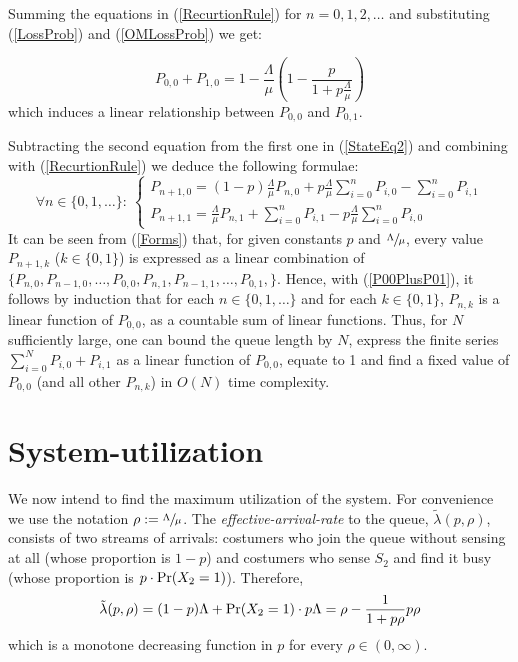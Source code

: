 \documentclass[11pt]{article}
\numberwithin{equation}{section}
\newcommand{\pr}{{\rm Pr}}
\begin{document}
Summing the equations in (\ref{RecurtionRule}) for $n=0,1,2,\ldots$ and substituting (\ref{LossProb}) and (\ref{OMLossProb}) we get:

\begin{equation}
	P_{0,0} + P_{1,0} = 1- \frac{ \Lambda}{ \mu}\left(1- \frac{p}{1+p \frac{\Lambda}{\mu}} \right) \label{P00PlusP01}
\end{equation}
which induces a linear relationship between $P_{0,0}$ and $P_{0,1}$.

Subtracting the second equation from the first one in (\ref{StateEq2}) and combining with (\ref{RecurtionRule}) we deduce the following formulae:
\begin{equation}
	\forall n \in \lbrace 0, 1, \ldots \rbrace: \
  	\begin{cases}
    	P_{n+1,0} = (1-p) \frac{\Lambda}{\mu} P_{n, 0} + p \frac{\Lambda}{\mu} \sum\limits_{i=0}^{n}P_{i,0} - \sum\limits_{i=0}^{n}P_{i,1}\\
   	 	P_{n+1,1} = \frac{\Lambda}{\mu} P_{n, 1} + \sum\limits_{i=0}^{n}P_{i,1} - p \frac{\Lambda}{\mu} \sum\limits_{i=0}^{n}P_{i,0}
  	\end{cases} \label{Forms}
\end{equation}
It can be seen from (\ref{Forms}) that, for given constants $p$ and $\sfrac{\Lambda}{\mu}$, every value $P_{n+1,k}$ ($k\in\lbrace0,1\rbrace$) is expressed as a linear combination of $\lbrace P_{n,0}, P_{n-1,0}, \ldots, P_{0,0}, P_{n,1}, P_{n-1,1}, \ldots, P_{0,1},  \rbrace$. Hence, with (\ref{P00PlusP01}), it follows by induction that for each $n \in \lbrace 0, 1, \ldots \rbrace$ and for each $k \in \lbrace 0, 1 \rbrace$, $P_{n,k}$ is a linear function of $P_{0,0}$, as a countable sum of linear functions. Thus, for $N$ sufficiently large, one can bound the queue length by $N$, express the finite series $\sum_{i=0}^{N} P_{i,0}+P_{i,1}$ as a linear function of $P_{0,0}$, equate to 1 and find a fixed value of $P_{0,0}$ (and all other $P_{n,k}$) in $O(N)$ time complexity.
\newpage

\section{System-utilization}
We now intend to find the maximum utilization of the system. For convenience we use the notation $\rho:=\sfrac{\Lambda}{\mu}$. The {\it effective-arrival-rate} to the queue, $\tilde{\lambda}(p,\rho)$, consists of two streams of arrivals: costumers who join the queue without sensing at all (whose proportion is $1-p$) and costumers who sense $S_{2}$ and find it busy (whose proportion is $p \cdot \pr(X_2=1)$). Therefore,
\begin{equation}
	\tilde{\lambda}(p,\rho) = (1-p)\Lambda + \pr(X_2=1)\cdot p \Lambda = \rho - \frac{1}{1+p\rho}p\rho \label{EffectiveRate}
\end{equation}
which is a monotone decreasing function in $p$ for every $\rho\in(0,\infty)$. 
\end{document}
